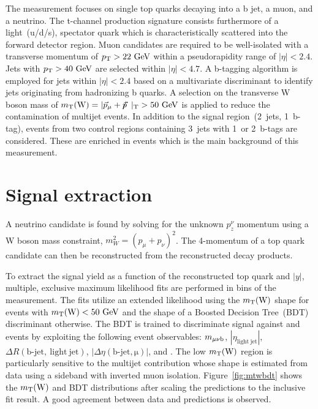 \documentclass[12pt]{article}
\begin{document}
The measurement focuses on single top quarks decaying into a b jet, a muon, and a neutrino. The t-channel production signature consists furthermore of a light~(u/d/s), spectator quark which is characteristically scattered into the forward detector region. Muon candidates are required to be well-isolated with a transverse momentum of $p_\mathrm{T}>22~\mathrm{GeV}$ within a pseudorapidity range of $|\eta|<2.4$. Jets with $p_\mathrm{T}>40~\mathrm{GeV}$ are selected within $|\eta|<4.7$. A b-tagging algorithm is employed for jets within $|\eta|<2.4$ based on a multivariate discriminant to identify jets originating from hadronizing b quarks. A selection on the transverse W boson mass of $m_{\mathrm{T}}(\mathrm{W})=|\vec{p}_{\mu}+\vec{p}\hspace{-0.5em}/\kern 0.5em|_\mathrm{T}>50~\mathrm{GeV}$ is applied to reduce the contamination of multijet events. In addition to the signal region~(2~jets, 1~b-tag), events from two control regions containing 3~jets with 1~or 2~b-tags are considered. These are enriched in \ttbar events which is the main background of this measurement.


\section{Signal extraction}

A neutrino candidate is found by solving for the unknown $p_{z}^{\nu}$ momentum using a W boson mass constraint, $m_{W}^{2}=(p_{\mu}+p_{\nu})^{2}$. The 4-momentum of a top quark candidate can then be reconstructed from the reconstructed decay products.

To extract the signal yield as a function of the reconstructed top quark \pt and $|y|$, multiple, exclusive maximum likelihood fits are performed in bins of the measurement. The fits utilize an extended likelihood using the $m_{\mathrm{T}}(\mathrm{W})$ shape for events with $m_{\mathrm{T}}(\mathrm{W})<50~\mathrm{GeV}$ and the shape of a Boosted Decision Tree~(BDT) discriminant otherwise. The BDT is trained to discriminate signal against \ttbar and \wjets events by exploiting the following event observables: $m_{\mu\nu \mathrm{b}}$, $|\eta_\mathrm{light~jet}|$, $\Delta R(\mathrm{b\mbox{-}jet,~light~jet})$, $|\Delta\eta(\mathrm{b\mbox{-}jet,\mu})|$, and \mtw. The low $m_{\mathrm{T}}(\mathrm{W})$ region is particularly sensitive to the multijet contribution whose shape is estimated from data using a sideband with inverted muon isolation. Figure~\ref{fig:mtwbdt} shows the $m_{\mathrm{T}}(\mathrm{W})$ and BDT distributions after scaling the predictions to the inclusive fit result. A good agreement between data and predictions is observed.
\end{document}
